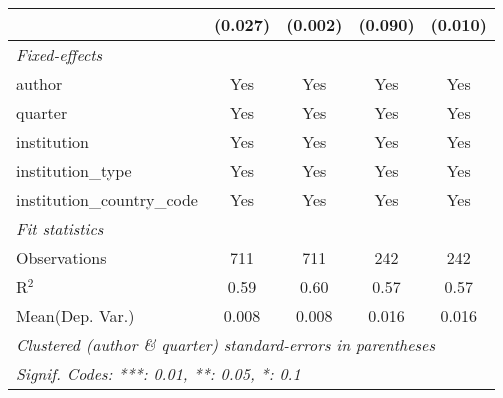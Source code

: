 \begin{tabular}{lcccc}
                                            & (0.027) & (0.002) & (0.090) & (0.010)\\   
   \midrule
   \emph{Fixed-effects}\\
   author                                   & Yes     & Yes     & Yes     & Yes\\  
   quarter                                  & Yes     & Yes     & Yes     & Yes\\  
   institution                              & Yes     & Yes     & Yes     & Yes\\  
   institution\_type                        & Yes     & Yes     & Yes     & Yes\\  
   institution\_country\_code               & Yes     & Yes     & Yes     & Yes\\  
   \midrule
   \emph{Fit statistics}\\
   Observations                             & 711     & 711     & 242     & 242\\  
   R$^2$                                    & 0.59    & 0.60    & 0.57    & 0.57\\  
Mean(Dep. Var.) & 0.008 & 0.008 & 0.016 & 0.016 \\
   \midrule \midrule
   \multicolumn{5}{l}{\emph{Clustered (author \& quarter) standard-errors in parentheses}}\\
   \multicolumn{5}{l}{\emph{Signif. Codes: ***: 0.01, **: 0.05, *: 0.1}}\\
\end{tabular}
\par\endgroup
